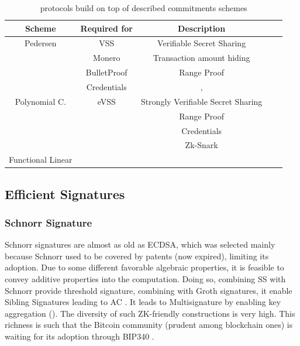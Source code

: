 \documentclass[11pt]{llncs2e/llncs}
\begin{document}
 
\begin{table}
\begin{center}
 \begin{tabular}{ |c| c|c|c|c|}
  \hline
  Scheme & Required for & Description \\
  \hline\hline
  Pedersen & VSS& Verifiable Secret Sharing\\
           & Monero & Transaction amount hiding \\
           & BulletProof & Range Proof \\
           & Credentials & \cite{LCKO21}, \cite{ElkhiyaouiCA21} \\
  \hline
  Polynomial C. & eVSS& Strongly Verifiable Secret Sharing \\
                & & Range Proof\\
                & & Credentials \\
                & & Zk-Snark \\
  \hline
  Functional Linear & & \\
  \hline
  
  \hline
 \end{tabular}
 \end{center}
 \caption{protocols build on top of described commitments schemes}
 \label{tab-usecommit}
\end{table}
 
\subsection{Efficient Signatures}
\label{section-sig}

\subsubsection{Schnorr Signature}
Schnorr signatures \cite{Schnorr89} are almost as old as ECDSA, which was selected mainly because Schnorr used to be covered by patents (now expired), limiting its adoption. Due to some different favorable algebraic properties, it is feasible to convey additive properties into the computation. Doing so, combining SS \cite{Shamir79} with Schnorr provide threshold signature, combining with Groth signatures, it enable Sibling Signatures leading to AC \cite{CamenischDD17}. It leads to Multisignature by enabling key aggregation (\cite{Musig2}). The diversity of such ZK-friendly constructions is very high. This richness is such that the Bitcoin community (prudent among blockchain ones) is waiting for its adoption through BIP340 \cite{BIP340}. 
 
\end{document}
